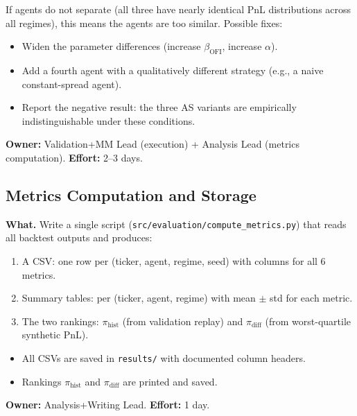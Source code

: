 \documentclass[11pt,a4paper]{article}
\begin{document}
\begin{warnbox}
  If agents do not separate (all three have nearly identical PnL distributions across all regimes), this means the agents are too similar.  Possible fixes:
  \begin{itemize}[nosep]
    \item Widen the parameter differences (increase $\beta_{\text{OFI}}$, increase $\alpha$).
    \item Add a fourth agent with a qualitatively different strategy (e.g., a naive constant-spread agent).
    \item Report the negative result: the three AS variants are empirically indistinguishable under these conditions.
  \end{itemize}
\end{warnbox}

\textbf{Owner:} Validation+MM Lead (execution) + Analysis Lead (metrics computation). \quad \textbf{Effort:} 2--3 days.

\subsection{Metrics Computation and Storage}

\textbf{What.}
Write a single script (\texttt{src/evaluation/compute\_metrics.py}) that reads all backtest outputs and produces:

\begin{enumerate}[nosep]
  \item A CSV: one row per (ticker, agent, regime, seed) with columns for all 6 metrics.
  \item Summary tables: per (ticker, agent, regime) with mean $\pm$ std for each metric.
  \item The two rankings: $\pi_{\text{hist}}$ (from validation replay) and $\pi_{\text{diff}}$ (from worst-quartile synthetic PnL).
\end{enumerate}

\begin{successbox}
  \begin{itemize}[nosep]
    \item All CSVs are saved in \texttt{results/} with documented column headers.
    \item Rankings $\pi_{\text{hist}}$ and $\pi_{\text{diff}}$ are printed and saved.
  \end{itemize}
\end{successbox}

\textbf{Owner:} Analysis+Writing Lead. \quad \textbf{Effort:} 1 day.
\end{document}

